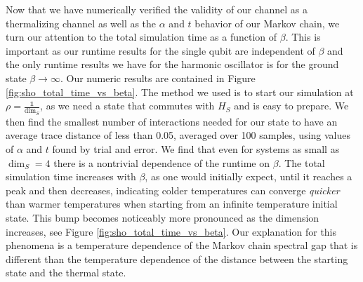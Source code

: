 \documentclass{article}
\newcommand{\identity}{\mathds{1}}
\begin{document}
Now that we have numerically verified the validity of our channel as a thermalizing channel as well as the $\alpha$ and $t$ behavior of our Markov chain, we turn our attention to the total simulation time as a function of $\beta$. This is important as our runtime results for the single qubit are independent of $\beta$ and the only runtime results we have for the harmonic oscillator is for the ground state $\beta \to \infty$. Our numeric results are contained in Figure \ref{fig:sho_total_time_vs_beta}. The method we used is to start our simulation at $\rho = \frac{\identity}{\dim_S}$, as we need a state that commutes with $H_S$ and is easy to prepare. We then find the smallest number of interactions needed for our state to have an average trace distance of less than 0.05, averaged over 100 samples, using values of $\alpha$ and $t$ found by trial and error. We find that even for systems as small as $\dim_S = 4$ there is a nontrivial dependence of the runtime on $\beta$. The total simulation time increases with $\beta$, as one would initially expect, until it reaches a peak and then decreases, indicating colder temperatures can converge \emph{quicker} than warmer temperatures when starting from an infinite temperature initial state. This bump becomes noticeably more pronounced as the dimension increases, see Figure \ref{fig:sho_total_time_vs_beta}. Our explanation for this phenomena is a temperature dependence of the Markov chain spectral gap that is different than the temperature dependence of the distance between the starting state and the thermal state. 
\end{document}
